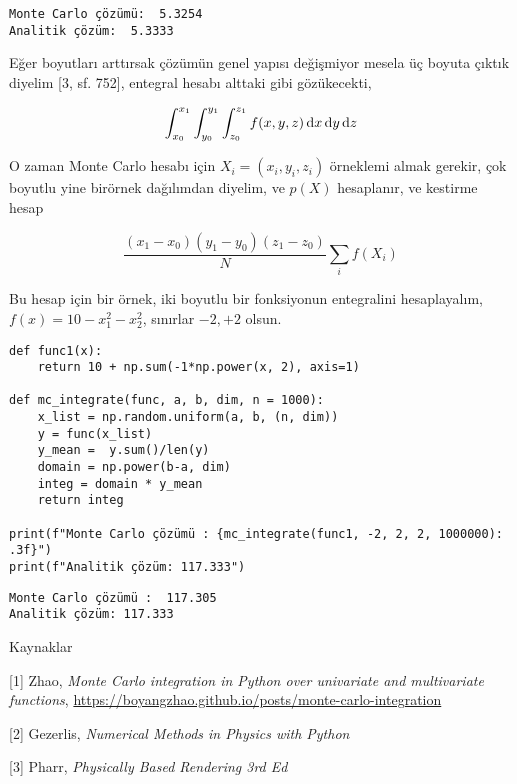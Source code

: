 \documentclass[12pt,fleqn]{article}\usepackage{../../common}
\begin{document}
\begin{verbatim}
Monte Carlo çözümü:  5.3254
Analitik çözüm:  5.3333
\end{verbatim}

Eğer boyutları arttırsak çözümün genel yapısı değişmiyor mesela üç boyuta çıktık
diyelim [3, sf. 752], entegral hesabı alttaki gibi gözükecekti,

$$
\int_{x_0}^{x_1} \int_{y_0}^{y_1} \int_{z_0}^{z_1}  f(x,y,z) \,\mathrm{d} x \,\mathrm{d} y \,\mathrm{d} z
$$

O zaman Monte Carlo hesabı için $X_i = (x_i,y_i,z_i)$ örneklemi almak gerekir,
çok boyutlu yine birörnek dağılımdan diyelim, ve $p(X)$ hesaplanır, ve kestirme
hesap

$$
\frac{(x_1-x_0)(y_1-y_0)(z_1-z_0)}{N} \sum_i f(X_i)
$$

Bu hesap için bir örnek, iki boyutlu bir fonksiyonun entegralini hesaplayalım,
$f(x) = 10 - x_1^2 - x_2^2$, sınırlar $-2,+2$ olsun.

\begin{verbatim}
def func1(x):
    return 10 + np.sum(-1*np.power(x, 2), axis=1)
  
def mc_integrate(func, a, b, dim, n = 1000):
    x_list = np.random.uniform(a, b, (n, dim))
    y = func(x_list)
    y_mean =  y.sum()/len(y)
    domain = np.power(b-a, dim)
    integ = domain * y_mean
    return integ

print(f"Monte Carlo çözümü : {mc_integrate(func1, -2, 2, 2, 1000000): .3f}")
print(f"Analitik çözüm: 117.333")
\end{verbatim}

\begin{verbatim}
Monte Carlo çözümü :  117.305
Analitik çözüm: 117.333
\end{verbatim}


Kaynaklar

[1] Zhao, {\em Monte Carlo integration in Python over univariate and multivariate functions},
    \url{https://boyangzhao.github.io/posts/monte-carlo-integration}

[2] Gezerlis, {\em Numerical Methods in Physics with Python}
    
[3] Pharr, {\em Physically Based Rendering 3rd Ed}
\end{document}
